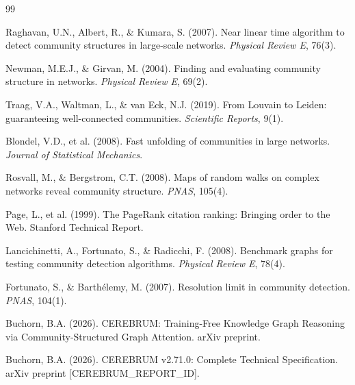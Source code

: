 \documentclass[10pt,twocolumn]{article}
\begin{document}

\begin{thebibliography}{99}

Raghavan, U.N., Albert, R., \& Kumara, S. (2007).
Near linear time algorithm to detect community structures in large-scale networks.
\emph{Physical Review E}, 76(3).

Newman, M.E.J., \& Girvan, M. (2004).
Finding and evaluating community structure in networks.
\emph{Physical Review E}, 69(2).

Traag, V.A., Waltman, L., \& van Eck, N.J. (2019).
From Louvain to Leiden: guaranteeing well-connected communities.
\emph{Scientific Reports}, 9(1).

Blondel, V.D., et al. (2008).
Fast unfolding of communities in large networks.
\emph{Journal of Statistical Mechanics}.

Rosvall, M., \& Bergstrom, C.T. (2008).
Maps of random walks on complex networks reveal community structure.
\emph{PNAS}, 105(4).

Page, L., et al. (1999).
The PageRank citation ranking: Bringing order to the Web.
Stanford Technical Report.

Lancichinetti, A., Fortunato, S., \& Radicchi, F. (2008).
Benchmark graphs for testing community detection algorithms.
\emph{Physical Review E}, 78(4).

Fortunato, S., \& Barthélemy, M. (2007).
Resolution limit in community detection.
\emph{PNAS}, 104(1).

Buchorn, B.A. (2026).
CEREBRUM: Training-Free Knowledge Graph Reasoning via Community-Structured Graph Attention.
arXiv preprint.

Buchorn, B.A. (2026).
CEREBRUM v2.71.0: Complete Technical Specification.
arXiv preprint [CEREBRUM\_REPORT\_ID].

\end{thebibliography}
\end{document}
